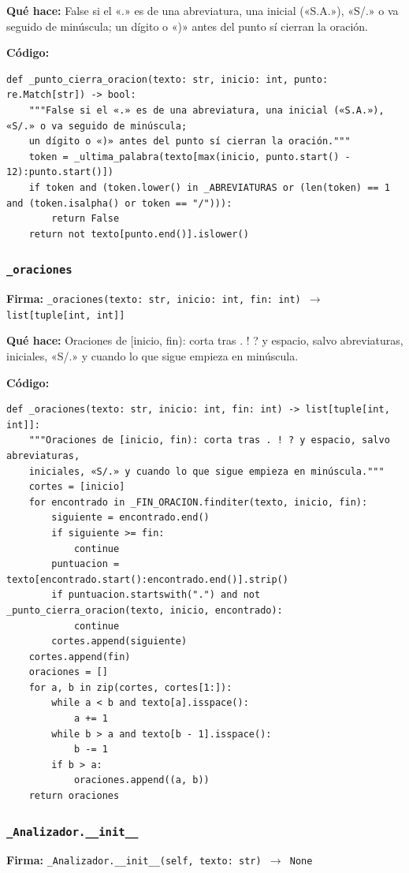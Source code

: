\documentclass[11pt,a4paper]{article}
\begin{document}
\textbf{Qué hace:} False si el «.» es de una abreviatura, una inicial («S.A.»), «S/.» o va seguido de minúscula;
un dígito o «)» antes del punto sí cierran la oración.

\textbf{Código:}
\begin{lstlisting}
def _punto_cierra_oracion(texto: str, inicio: int, punto: re.Match[str]) -> bool:
    """False si el «.» es de una abreviatura, una inicial («S.A.»), «S/.» o va seguido de minúscula;
    un dígito o «)» antes del punto sí cierran la oración."""
    token = _ultima_palabra(texto[max(inicio, punto.start() - 12):punto.start()])
    if token and (token.lower() in _ABREVIATURAS or (len(token) == 1 and (token.isalpha() or token == "/"))):
        return False
    return not texto[punto.end()].islower()
\end{lstlisting}

\subsubsection*{\texttt{\_oraciones}}
\textbf{Firma:} \texttt{\_oraciones(texto: str, inicio: int, fin: int) $\rightarrow$ list[tuple[int, int]]}

\textbf{Qué hace:} Oraciones de [inicio, fin): corta tras . ! ? y espacio, salvo abreviaturas,
iniciales, «S/.» y cuando lo que sigue empieza en minúscula.

\textbf{Código:}
\begin{lstlisting}
def _oraciones(texto: str, inicio: int, fin: int) -> list[tuple[int, int]]:
    """Oraciones de [inicio, fin): corta tras . ! ? y espacio, salvo abreviaturas,
    iniciales, «S/.» y cuando lo que sigue empieza en minúscula."""
    cortes = [inicio]
    for encontrado in _FIN_ORACION.finditer(texto, inicio, fin):
        siguiente = encontrado.end()
        if siguiente >= fin:
            continue
        puntuacion = texto[encontrado.start():encontrado.end()].strip()
        if puntuacion.startswith(".") and not _punto_cierra_oracion(texto, inicio, encontrado):
            continue
        cortes.append(siguiente)
    cortes.append(fin)
    oraciones = []
    for a, b in zip(cortes, cortes[1:]):
        while a < b and texto[a].isspace():
            a += 1
        while b > a and texto[b - 1].isspace():
            b -= 1
        if b > a:
            oraciones.append((a, b))
    return oraciones
\end{lstlisting}

\subsubsection*{\texttt{\_Analizador.\_\_init\_\_}}
\textbf{Firma:} \texttt{\_Analizador.\_\_init\_\_(self, texto: str) $\rightarrow$ None}
\end{document}

